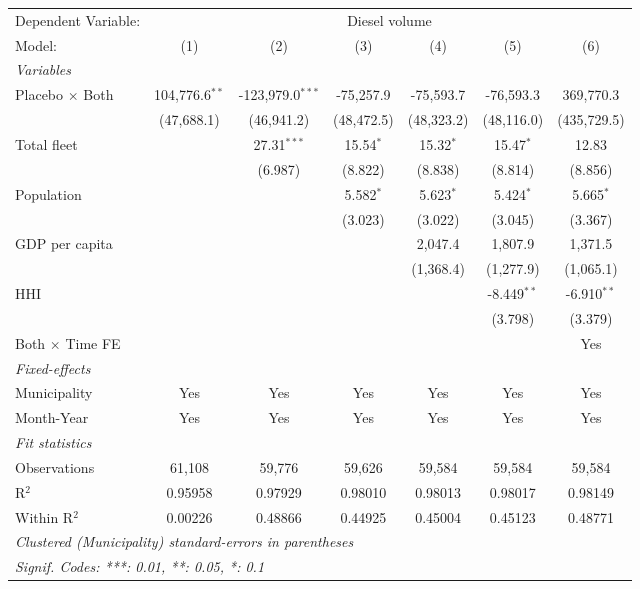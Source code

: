 \documentclass[
]{article}
\begin{document}
\begin{tabular}{lcccccc}
\tabularnewline\midrule\midrule
Dependent Variable:&\multicolumn{6}{c}{Diesel volume}\\
Model:&(1) & (2) & (3) & (4) & (5) & (6)\\
\midrule \emph{Variables}&   &   &   &   &   &  \\
Placebo $\times $ Both & 104,776.6$^{**}$ & -123,979.0$^{***}$ & -75,257.9 & -75,593.7 & -76,593.3 & 369,770.3\\
  &(47,688.1) & (46,941.2) & (48,472.5) & (48,323.2) & (48,116.0) & (435,729.5)\\
Total fleet &    & 27.31$^{***}$ & 15.54$^{*}$ & 15.32$^{*}$ & 15.47$^{*}$ & 12.83\\
  &   & (6.987) & (8.822) & (8.838) & (8.814) & (8.856)\\
Population &    &    & 5.582$^{*}$ & 5.623$^{*}$ & 5.424$^{*}$ & 5.665$^{*}$\\
  &   &    & (3.023) & (3.022) & (3.045) & (3.367)\\
GDP per capita &    &    &    & 2,047.4 & 1,807.9 & 1,371.5\\
  &   &    &    & (1,368.4) & (1,277.9) & (1,065.1)\\
HHI &    &    &    &    & -8.449$^{**}$ & -6.910$^{**}$\\
  &   &    &    &    & (3.798) & (3.379)\\
Both $\times$ Time FE &  &  &  &  &  & Yes\\
\midrule \emph{Fixed-effects}&   &   &   &   &   &  \\
Municipality & Yes & Yes & Yes & Yes & Yes & Yes\\
Month-Year & Yes & Yes & Yes & Yes & Yes & Yes\\
\midrule \emph{Fit statistics}&  & & & & & \\
Observations & 61,108&59,776&59,626&59,584&59,584&59,584\\
R$^2$ & 0.95958&0.97929&0.98010&0.98013&0.98017&0.98149\\
Within R$^2$ & 0.00226&0.48866&0.44925&0.45004&0.45123&0.48771\\
\midrule\midrule\multicolumn{7}{l}{\emph{Clustered (Municipality) standard-errors in parentheses}}\\
\multicolumn{7}{l}{\emph{Signif. Codes: ***: 0.01, **: 0.05, *: 0.1}}\\
\end{tabular}
\end{document}
